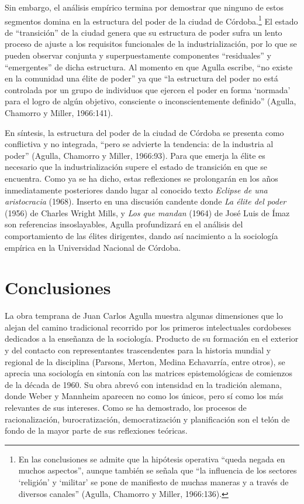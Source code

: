 Sin embargo, el análisis empírico termina por demostrar que ninguno de estos segmentos domina en la estructura del poder de la ciudad de Córdoba.\footnote{En las conclusiones se admite que la hipótesis operativa \enquote{queda negada en muchos aspectos}, aunque también se señala que \enquote{la influencia de los sectores \enquote{religión} y \enquote{militar} se pone de manifiesto de muchas maneras y a través de diversos canales} (Agulla, Chamorro y Miller, 1966:136).} El estado de \enquote{transición} de la ciudad genera que su estructura de poder sufra un lento proceso de ajuste a los requisitos funcionales de la industrialización, por lo que se pueden observar conjunta y superpuestamente componentes \enquote{residuales} y \enquote{emergentes} de dicha estructura. Al momento en que Agulla escribe, \enquote{no existe en la comunidad una élite de poder} ya que \enquote{la estructura del poder no está controlada por un grupo de individuos que ejercen el poder en forma \enquote{normada} para el logro de algún objetivo, consciente o inconscientemente definido} (Agulla, Chamorro y Miller, 1966:141).

En síntesis, la estructura del poder de la ciudad de Córdoba se presenta como conflictiva y no integrada, \enquote{pero se advierte la tendencia: de la industria al poder} (Agulla, Chamorro y Miller, 1966:93). Para que emerja la élite es necesario que la industrialización supere el estado de transición en que se encuentra. Como ya se ha dicho, estas reflexiones se prolongarán en los años inmediatamente posteriores dando lugar al conocido texto \emph{Eclipse de una aristocracia} (1968). Inserto en una discusión candente donde \emph{La élite del poder} (1956) de Charles Wright Mills, y \emph{Los que mandan} (1964) de José Luis de Ímaz son referencias insoslayables, Agulla profundizará en el análisis del comportamiento de las élites dirigentes, dando así nacimiento a la sociología empírica en la Universidad Nacional de Córdoba.

\section{Conclusiones}

La obra temprana de Juan Carlos Agulla muestra algunas dimensiones que lo alejan del camino tradicional recorrido por los primeros intelectuales cordobeses dedicados a la enseñanza de la sociología. Producto de su formación en el exterior y del contacto con representantes trascendentes para la historia mundial y regional de la disciplina (Parsons, Merton, Medina Echavarría, entre otros), se aprecia una sociología en sintonía con las matrices epistemológicas de comienzos de la década de 1960. Su obra abrevó con intensidad en la tradición alemana, donde Weber y Mannheim aparecen no como los únicos, pero sí como los más relevantes de sus intereses. Como se ha demostrado, los procesos de racionalización, burocratización, democratización y planificación son el telón de fondo de la mayor parte de sus reflexiones teóricas.

